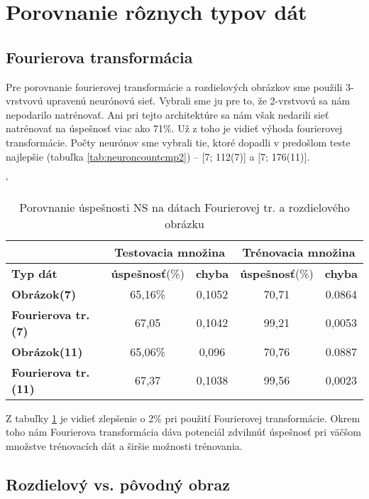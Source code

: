 \section{Porovnanie rôznych typov dát}

\subsection{Fourierova transformácia}

Pre porovnanie fourierovej transformácie a rozdielových obrázkov sme použili 3-vrstvovú upravenú neurónovú sieť. Vybrali sme ju pre to, že 2-vrstvovú sa nám nepodarilo natrénovať. Ani pri tejto architektúre sa nám však nedarili sieť natrénovať na úspešnosť viac ako 71\%. Už z toho je vidieť výhoda fourierovej transformácie. Počty neurónov sme vybrali tie, ktoré dopadli v predošlom teste najlepšie (tabuľka \ref{tab:neuroncountcmp2}) -- [7; 112(7)] a [7; 176(11)].

\begin{table}[htp]
\catcode` %
\centering
\begin{tabular}{|l|c|c|c|c|}
\cline{2-5}
\multicolumn{1}{l}{} & \multicolumn{2}{|c|}{\textbf{Testovacia množina}} & \multicolumn{2}{c|}{\textbf{Trénovacia množina}}\\ 
\hline
\textbf{Typ dát} & \textbf{úspešnosť}(\%) & \textbf{chyba} & \textbf{úspešnosť}(\%) & \textbf{chyba}\\ \hline
\textbf{Obrázok(7)} & 65,16\% & 0,1052 & 70,71 & 0.0864 \\ \hline
\textbf{Fourierova tr.(7)} & 67,05 & 0,1042 & 99,21 & 0,0053 \\ \hline 
\textbf{Obrázok(11)} & 65,06\% & 0,096 & 70,76 & 0.0887 \\ \hline
\textbf{Fourierova tr.(11)} & 67,37 & 0,1038 & 99,56 & 0,0023 \\ \hline
\end{tabular}
\caption{Porovnanie úspešnosti NS na dátach Fourierovej tr. a rozdielového obrázku}
\label{tab:neuraldataftcmp}
\end{table}

Z tabuľky \ref{tab:neuraldataftcmp} je vidieť zlepšenie o 2\% pri použití Fourierovej transformácie. Okrem toho nám
Fourierova transformácia dáva potenciál zdvihnúť úspešnosť pri väčšom množstve trénovacích dát a širšie možnosti trénovania. 

\subsection{Rozdielový vs. pôvodný obraz}

